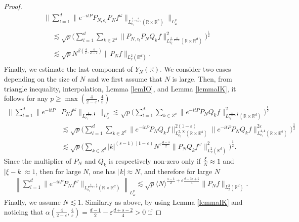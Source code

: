 \documentclass[10pt,leqno]{amsart}
\newcommand{\R}{\mathbb{R}}
\numberwithin{equation}{section}
\newcommand{\Z}{\mathbb{Z}}
\begin{document}
\begin{proof}
\begin{multline*}
\bigg\|\sum_{l=1}^d \|e^{-it P} P_{N,e_l} P_N f^\omega \|_{L^{\frac{4}{\varepsilon},\frac{4}{2-\varepsilon}}_{e_l} (\R\times \R^d)} \bigg\|_{L_\omega^p}  \\
\begin{aligned}
 &\lesssim \sqrt{p} \bigg( \sum_{l = 1}^d \sum_{k \in \Z^d} \|P_{N,e_l} P_N Q_k f \|^2_{L^{\frac{4}{\varepsilon},\frac{4}{2-\varepsilon}}_{e_l} (\R\times \R^d)} \bigg)^{\frac{1}{2}} \\
& \lesssim \sqrt{p}N^{\beta (\frac{4}{\varepsilon},\frac{4}{2-\varepsilon})} \|P_N f\|_{L_x^2 (\R^d )}.
\end{aligned}
\end{multline*}
Finally, we estimate the last component of $Y_N (\R)$. We consider two cases depending on the size of $N$ and we first  assume that $N$ is large. Then,
from triangle inequality, interpolation,  Lemma \ref{lemIO}, and Lemma \ref{lemmaIK}, it follows for any $p \geq \max (\frac{4}{2-\varepsilon},\frac{4}{\varepsilon})$
\begin{align*}
\bigg\|\sum_{l=1}^d\|e^{-it P}  &P_N f^\omega \|_{ L^{\frac{4}{2-\varepsilon},\frac{4}{\varepsilon}}_{e_l} } \bigg\|_{L^p_\omega}
\lesssim \sqrt{p} \bigg(\sum_{l=1}^d \sum_{k \in Z^d} \| e^{-it P}  P_N Q_k f \|^2_{L^{\frac{4}{2-\varepsilon},\frac{4}{\varepsilon}}_{e_l} (\R\times \R^d)}\bigg)^{\frac{1}{2}}\\
&\lesssim  \sqrt{p} \bigg(\sum_{l=1}^d \sum_{k \in Z^d} \|e^{-it P}  P_N Q_k f\|_{L^{2,\infty}_{e_l} (\R \times \R^d)}^{2(1-\varepsilon)} \|e^{-it P}  P_N Q_k f\|_{L^{4,4}_{e_l}(\R \times \R^d) }^{2\varepsilon} 
\bigg)^{\frac{1}{2}}\\
&\lesssim\sqrt{p} \bigg( \sum_{k \in Z^d} |k|^{(s-1)(1-\varepsilon)} N^{\varepsilon \frac{d -s}{2} } \|P_N Q_k f^\omega\|^2_{L_x^2 (\R^d)} \bigg)^{\frac{1}{2}}.
\end{align*}
Since the multiplier of $P_N$ and $Q_k$ is respectively non-zero only if $\frac{\xi}{N} \approx 1$ and $|\xi - k| \approx 1$, then for large $N$, one has $|k|\approx N$, and therefore 
for large $N$
\begin{align*}
&\left\|\sum_{l=1}^d \|e^{-it P}  P_N f^\omega \|_{  L^{\frac{4}{2-\varepsilon},\frac{4}{\varepsilon}}_{e_l} (\R\times \R^d)} \right\|_{L_\omega^p}
\lesssim \sqrt{p}\langle N\rangle^{\frac{s-1}{2} + \varepsilon  \frac{d -3s+2}{4}} \|P_N f\|_{L_2^2 (\R^d )}.
\end{align*}
Finally, we assume $N \lesssim 1$. Similarly as above, by using Lemma \ref{lemmaIK} and noticing that $\alpha (\frac{4}{2-\varepsilon},\frac{4}{\varepsilon} )= \frac{d-1}{2}- \varepsilon \frac{d+s -2}{4}>0$ if 

\end{proof}
\end{document}

